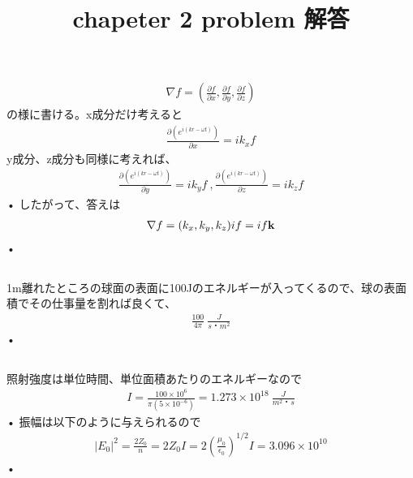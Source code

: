 \documentclass{jsarticle}
\title{chapeter 2 problem 解答}
\begin{document}
\maketitle
\renewcommand{\thesubsection}{2.\arabic{subsection})}





\subsection{}

\begin{align}
\nabla f = (\frac{\partial f}{\partial x},\frac{\partial f}{\partial y},\frac{\partial f}{\partial z}) 
\end{align}
の様に書ける。x成分だけ考えると
\begin{align}
\frac{\partial (e^{i(kr - \omega t)})}{\partial x} = ik_{x}f 
\end{align}
y成分、z成分も同様に考えれば、
\begin{align}
\frac{\partial (e^{i(kr - \omega t)})}{\partial y} = ik_{y}f \ ,
\frac{\partial (e^{i(kr - \omega t)})}{\partial z} = ik_{z}f
\end{align}•
したがって、答えは
\begin{align}
\nabla f = (k_{x},k_{y},k_{z})if = if\bf{k}
\end{align}•




\subsection{}
1m離れたところの球面の表面に100Jのエネルギーが入ってくるので、球の表面積でその仕事量を割れば良くて、
\begin{align}
\frac{100}{4\pi} \  \frac{J}{s・m^2}
\end{align}•




\subsection{}
照射強度は単位時間、単位面積あたりのエネルギーなので
\begin{align}
I = \frac{100\times 10^{6}}{\pi(5 \times 10^{-6})} = 1.273 \times 10^{18} \ \frac{J}{m^2・s}
\end{align}•
振幅は以下のように与えられるので
\begin{align}
|E_0|^{2} = \frac{2Z_0}{n} = 2Z_0 I = 2(\frac{\mu_0}{\epsilon_0})^{1/2}I = 3.096\times 10^{10}
\end{align}•
\end{document}
